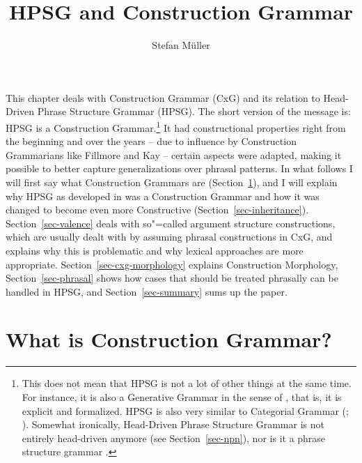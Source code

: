 \documentclass[output=paper
	        ,collection
	        ,collectionchapter
 	        ,biblatex
                ,babelshorthands
                ,newtxmath
                ,draftmode
                ,colorlinks, citecolor=brown
]{langscibook}
\author{Stefan Müller\affiliation{Humboldt-Universität zu Berlin}}
\title{HPSG and Construction Grammar}
\begin{document}
\maketitle
\label{firstpage-cxg}\label{chap-cxg}


\noindent
This chapter deals with Construction Grammar (CxG) and its relation to Head-Driven Phrase Structure
Grammar (HPSG). The short version of the message is: HPSG is a Construction Grammar.\footnote{%
  This does not mean that HPSG is not a lot of other things at the same time. For instance, it is
  also a Generative Grammar in the sense of \citet[]{Chomsky65a}, that is, it is explicit and
  formalized. HPSG is also very similar to Categorial Grammar (\citealt{MuellerUnifying};
  ). Somewhat ironically, Head-Driven Phrase Structure Grammar is not entirely
  head-driven anymore (see Section~\ref{sec-npn}), nor is it a phrase structure grammar .
}
It had constructional properties right from the beginning and over the years -- due to influence by
Construction Grammarians like Fillmore and Kay -- certain aspects were adapted, making it possible to better
capture generalizations over phrasal patterns. In what follows I will first say what Construction
Grammars are (Section~\ref{sec-cxg}), and I will explain why HPSG as developed in  was a
Construction Grammar and how it was changed to become even more Constructive
(Section~\ref{sec-inheritance}). Section~\ref{sec-valence} deals with so"=called argument structure
constructions, which are usually dealt with by assuming phrasal constructions in CxG, and explains
why this is problematic and why lexical approaches are more appropriate. Section~\ref{sec-cxg-morphology} explains
Construction Morphology, Section~\ref{sec-phrasal} shows how cases that should be treated phrasally
can be handled in HPSG, and Section~\ref{sec-summary} sums up the paper.

\section{What is Construction Grammar?}
\label{sec-cxg}
\end{document}

